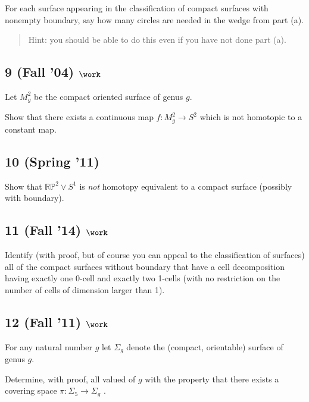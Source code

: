 For each surface appearing in the classification of compact surfaces
with nonempty boundary, say how many circles are needed in the wedge
from part (a).

\begin{quote}
Hint: you should be able to do this even if you have not done part (a).
\end{quote}

\hypertarget{fall-04-work-4}{%
\subsection{\texorpdfstring{9 (Fall '04)
\(\work\)}{9 (Fall '04) \textbackslash work}}\label{fall-04-work-4}}

Let \(M_g^2\) be the compact oriented surface of genus \(g\).

Show that there exists a continuous map \(f : M_g^2 \to S^2\) which is
not homotopic to a constant map.

\hypertarget{spring-11}{%
\subsection{10 (Spring '11)}\label{spring-11}}

Show that \({\mathbb{RP}}^2 \lor S^1\) is \emph{not} homotopy equivalent
to a compact surface (possibly with boundary).

\hypertarget{fall-14-work-4}{%
\subsection{\texorpdfstring{11 (Fall '14)
\(\work\)}{11 (Fall '14) \textbackslash work}}\label{fall-14-work-4}}

Identify (with proof, but of course you can appeal to the classification
of surfaces) all of the compact surfaces without boundary that have a
cell decomposition having exactly one 0-cell and exactly two 1-cells
(with no restriction on the number of cells of dimension larger than 1).

\hypertarget{fall-11-work-2}{%
\subsection{\texorpdfstring{12 (Fall '11)
\(\work\)}{12 (Fall '11) \textbackslash work}}\label{fall-11-work-2}}

For any natural number \(g\) let \(\Sigma_g\) denote the (compact,
orientable) surface of genus \(g\).

Determine, with proof, all valued of \(g\) with the property that there
exists a covering space \(\pi : \Sigma_5 \to \Sigma_g\) .

